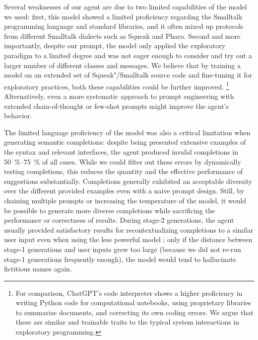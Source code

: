 Several weaknesses of our agent are due to two limited capabilities of the \gptfouro model we used:
first, this model showed a limited proficiency regarding the Smalltalk programming language and standard libraries, and it often mixed up protocols from different Smalltalk dialects such as Squeak and Pharo.
Second and more importantly, despite our prompt, the model only applied the exploratory paradigm to a limited degree and was not eager enough to consider and try out a larger number of different classes and messages.
We believe that by training a model on an extended set of Squeak"/Smalltalk source code and fine-tuning it for exploratory practices, both these capabilities could be further improved.%
\footnote{
	For comparison, ChatGPT's code interpreter shows a higher proficiency in writing Python code for computational notebooks, using proprietary libraries to summarize documents, and correcting its own coding errors.
	We argue that these are similar and trainable traits to the typical system interactions in exploratory programming.
}
Alternatively, even a more systematic approach to prompt engineering with extended chain-of-thought or few-shot prompts might improve the agent's behavior.

The limited language proficiency of the model was also a critical limitation when generating semantic completions:
despite being presented extensive examples of the syntax and relevant interfaces, the agent produced invalid completions in \qty{50}{\percent}--\qty{75}{\percent} of all cases.
While we could filter out these errors by dynamically testing completions, this reduces the quantity and the effective performance of suggestions substantially.
Completions generally exhibited an acceptable diversity over the different provided examples even with a naive prompt design.
Still, by chaining multiple prompts or increasing the temperature of the model, it would be possible to generate more diverse completions while sacrificing the performance or correctness of results.
During stage-2 generations, the agent usually provided satisfactory results for recontextualizing completions to a similar user input even when using the less powerful model \gptfouromini; only if the distance between stage-1 generations and user inputs grew too large (because we did not re-run stage-1 generations frequently enough), the model would tend to hallucinate fictitious names again.
